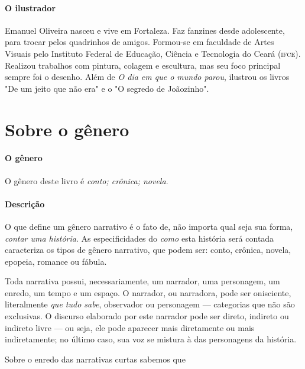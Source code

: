 \documentclass[11pt]{extarticle}
\begin{document}

\paragraph{O ilustrador} Emanuel Oliveira nasceu e vive em Fortaleza. Faz fanzines desde adolescente, para trocar pelos quadrinhos de amigos. Formou-se em faculdade de Artes Visuais pelo Instituto Federal de Educação, Ciência e Tecnologia do Ceará (\textsc{ifce}). Realizou trabalhos com pintura, colagem e escultura, mas seu foco principal sempre foi o desenho. Além de \textit{O dia em que o mundo parou}, ilustrou os livros "De um jeito que não era" e o "O segredo de Joãozinho".


\section{Sobre o gênero}

\paragraph{O gênero} O gênero deste livro é \textit{conto; crônica; novela}.

\paragraph{Descrição} O que define um gênero narrativo é o fato de, não importa qual seja sua forma, \textit{contar uma história}.
As especificidades do \textit{como} esta história será contada caracteriza os tipos de gênero narrativo, que podem ser: conto, crônica, novela, epopeia, romance ou fábula. 

Toda narrativa possui, necessariamente, um narrador, uma personagem, um enredo, um tempo e um espaço. O narrador, ou narradora, pode ser onisciente, literalmente \textit{que tudo sabe}, observador ou personagem --- categorias que não são exclusivas. O discurso elaborado por este narrador pode ser direto, indireto ou indireto livre --- ou seja, ele pode aparecer mais diretamente ou mais indiretamente; no último caso, sua voz se mistura à das personagens da história.

Sobre o enredo das narrativas curtas sabemos que
\end{document}
